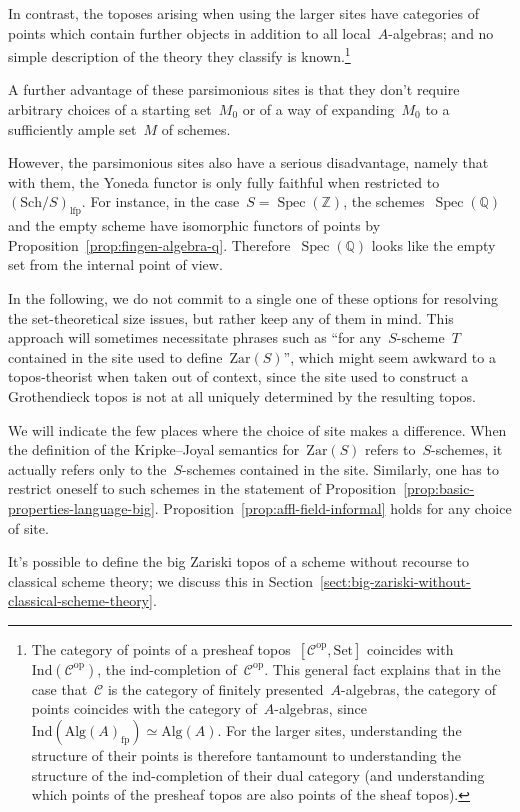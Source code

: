\documentclass[10pt,reqno,a4paper]{amsbook}
\theoremstyle{definition}
\theoremstyle{plain}
\theoremstyle{remark}
\newcommand{\ZZ}{\mathbb{Z}}
\renewcommand{\C}{\mathcal{C}}
\newcommand{\QQ}{\mathbb{Q}}
\newcommand{\Ind}{\mathrm{Ind}}
\newcommand{\Set}{\mathrm{Set}}
\newcommand{\Zar}{\mathrm{Zar}}
\newcommand{\Sch}{\mathrm{Sch}}
\newcommand{\Alg}{\mathrm{Alg}}
\newcommand{\lfp}{\mathrm{lfp}}
\newcommand{\fp}{\mathrm{fp}}
\DeclareMathOperator{\Spec}{Spec}
\newcommand{\op}{\mathrm{op}}
\newcommand{\?}{\,{:}\,}
\renewcommand{\_}{\mathpunct{.}\,}
\begin{document}
{In contrast, the toposes arising when using the larger sites have categories of
points which contain further objects in addition to all local~$A$-algebras; and
no simple description of the theory they classify is known.\footnote{The
category of points of a presheaf topos~$[\C^\op,\Set]$ coincides
with~$\Ind(\C^\op)$, the ind-completion of~$\C^\op$. This general fact explains that
in the case that~$\C$ is the category of finitely presented~$A$-algebras,
the category of points coincides with the category of~$A$-algebras,
since~$\Ind(\Alg(A)_\fp) \simeq \Alg(A)$. For the larger sites, understanding
the structure of their points is therefore tantamount to understanding the
structure of the ind-completion of their dual category (and understanding which
points of the presheaf topos are also points of the sheaf topos).}

A further advantage of these parsimonious sites is that they don't require arbitrary
choices of a starting set~$M_0$ or of a way of expanding~$M_0$ to a sufficiently
ample set~$M$ of schemes.

However, the parsimonious sites also have a serious disadvantage, namely that
with them, the Yoneda functor is only fully faithful when restricted
to~$(\Sch/S)_\lfp$. For instance, in the case~$S = \Spec(\ZZ)$, the
schemes~$\Spec(\QQ)$ and the empty scheme have isomorphic functors of points by Proposition~\ref{prop:fingen-algebra-q}.
Therefore~$\Spec(\QQ)$ looks like the empty set from the internal point of
view.

In the following, we do not commit to a single one of these options for
resolving the set-theoretical size issues, but rather keep any of them
in mind. This approach will sometimes necessitate phrases such as ``for
any~$S$-scheme~$T$ contained in the site used to define~$\Zar(S)$'', which might
seem awkward to a topos-theorist when taken out of context, since
the site used to construct a Grothendieck topos is not at all uniquely
determined by the resulting topos.

We will indicate the few places where the choice of site makes a difference.
When the definition of the Kripke--Joyal semantics for~$\Zar(S)$ refers
to~$S$-schemes, it actually refers only to the~$S$-schemes contained in the
site. Similarly, one has to restrict oneself to such schemes in the statement
of Proposition~\ref{prop:basic-properties-language-big}.
Proposition~\ref{prop:affl-field-informal} holds for any choice of site.

It's possible to define the big Zariski topos of a scheme without recourse to
classical scheme theory; we discuss this in
Section~\ref{sect:big-zariski-without-classical-scheme-theory}.


}
\end{document}
